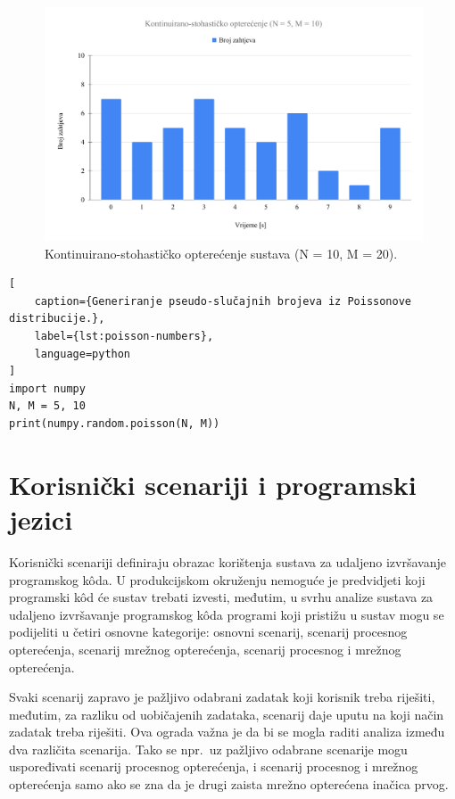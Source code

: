 \documentclass[times, utf8, diplomski]{fer}
\begin{document}
\begin{figure}[htb]
	\centering
	\includegraphics[width=\textwidth]{images/Kontinuirano-stohastičko opterećenje (N = 5, M = 10).pdf}
	\caption{
		Kontinuirano-stohastičko opterećenje sustava (N = 10, M = 20).
	}
	\label{fig:stochastic-load}
\end{figure}

\begin{lstlisting}[
    caption={Generiranje pseudo-slučajnih brojeva iz Poissonove distribucije.},
    label={lst:poisson-numbers},
    language=python
]
import numpy
N, M = 5, 10
print(numpy.random.poisson(N, M))
\end{lstlisting}

\section{Korisnički scenariji i programski jezici}
Korisnički scenariji definiraju obrazac korištenja sustava za udaljeno izvršavanje programskog kôda. U produkcijskom okruženju nemoguće je predvidjeti koji programski kôd će sustav trebati izvesti, međutim, u svrhu analize sustava za udaljeno izvršavanje programskog kôda programi koji pristižu u sustav mogu se podijeliti u četiri osnovne kategorije: osnovni scenarij, scenarij procesnog opterećenja, scenarij mrežnog opterećenja, scenarij procesnog i mrežnog opterećenja.

Svaki scenarij zapravo je pažljivo odabrani zadatak koji korisnik treba riješiti, međutim, za razliku od uobičajenih zadataka, scenarij daje uputu na koji način zadatak treba riješiti. Ova ograda važna je da bi se mogla raditi analiza između dva različita scenarija. Tako se npr.\ uz pažljivo odabrane scenarije mogu uspoređivati scenarij procesnog opterećenja, i scenarij procesnog i mrežnog opterećenja samo ako se zna da je drugi zaista mrežno opterećena inačica prvog.
\end{document}

